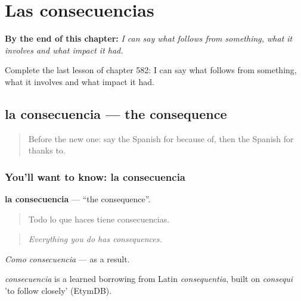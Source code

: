 
\chapter{Las consecuencias}
\label{ch:es-las-consecuencias}

\begin{chapteropening}
\textbf{By the end of this chapter:} \emph{I can say what follows from something, what it involves and what impact it had.}

Complete the last lesson of chapter 582: I can say what follows from something, what it involves and what impact it had.
\end{chapteropening}

\section[la consecuencia]{la consecuencia — the consequence}

\label{lesson:ES-C582-consecuencia}



\begin{quote}
Before the new one: say the Spanish for because of, then the Spanish for thanks to.
\end{quote}

\subsection*{You'll want to know: la consecuencia}
\textbf{la consecuencia} — \textquotedblleft{}the consequence\textquotedblright{}.

\begin{quote}
Todo lo que haces tiene consecuencias.
\end{quote}

\begin{quote}
\emph{Everything you do has consequences.}
\end{quote}

\emph{Como consecuencia} — as a result.

\begin{cousinweb}
\emph{consecuencia} is a learned borrowing from Latin \emph{consequentia}, built on \emph{consequi} 'to follow closely' (EtymDB).
\end{cousinweb}

